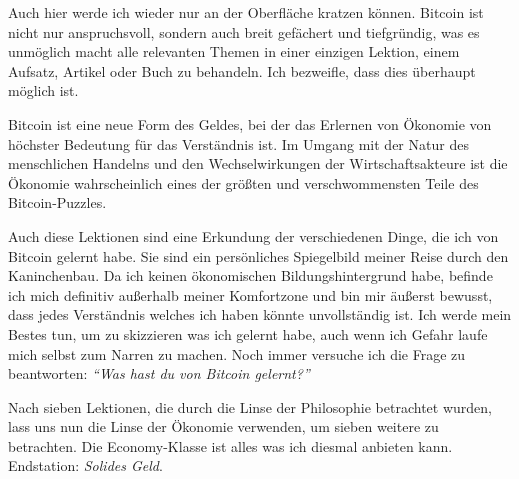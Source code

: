 Auch hier werde ich wieder nur an der Oberfläche kratzen können. Bitcoin ist
nicht nur anspruchsvoll, sondern auch breit gefächert und tiefgründig, was es
unmöglich macht alle relevanten Themen in einer einzigen Lektion, einem
Aufsatz, Artikel oder Buch zu behandeln. Ich bezweifle, dass dies überhaupt
möglich ist.

Bitcoin ist eine neue Form des Geldes, bei der das Erlernen von Ökonomie von
höchster Bedeutung für das Verständnis ist. Im Umgang mit der Natur des
menschlichen Handelns und den Wechselwirkungen der Wirtschaftsakteure ist die
Ökonomie wahrscheinlich eines der größten und verschwommensten Teile des
Bitcoin-Puzzles.

Auch diese Lektionen sind eine Erkundung der verschiedenen Dinge, die ich von
Bitcoin gelernt habe. Sie sind ein persönliches Spiegelbild meiner Reise durch
den Kaninchenbau. Da ich keinen ökonomischen Bildungshintergrund habe, befinde ich mich
definitiv außerhalb meiner Komfortzone und bin mir äußerst bewusst, dass jedes
Verständnis welches ich haben könnte unvollständig ist. Ich werde mein Bestes
tun, um zu skizzieren was ich gelernt habe, auch wenn ich Gefahr laufe mich
selbst zum Narren zu machen. Noch immer versuche ich die Frage zu beantworten:
\textit{\enquote{Was hast du von Bitcoin gelernt?}}

Nach sieben Lektionen, die durch die Linse der Philosophie betrachtet wurden,
lass uns nun die Linse der Ökonomie verwenden, um sieben weitere zu betrachten.
Die Economy-Klasse ist alles was ich diesmal anbieten kann. Endstation:
\textit{Solides Geld}.

